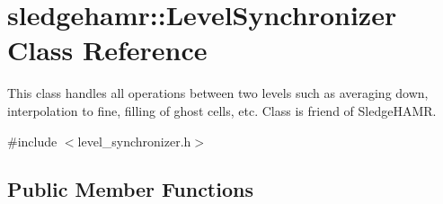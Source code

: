 \hypertarget{classsledgehamr_1_1LevelSynchronizer}{}\section{sledgehamr\+:\+:Level\+Synchronizer Class Reference}
\label{classsledgehamr_1_1LevelSynchronizer}


This class handles all operations between two levels such as averaging down, interpolation to fine, filling of ghost cells, etc. Class is friend of Sledge\+H\+A\+MR.  




{\ttfamily \#include $<$level\+\_\+synchronizer.\+h$>$}

\subsection*{Public Member Functions}
